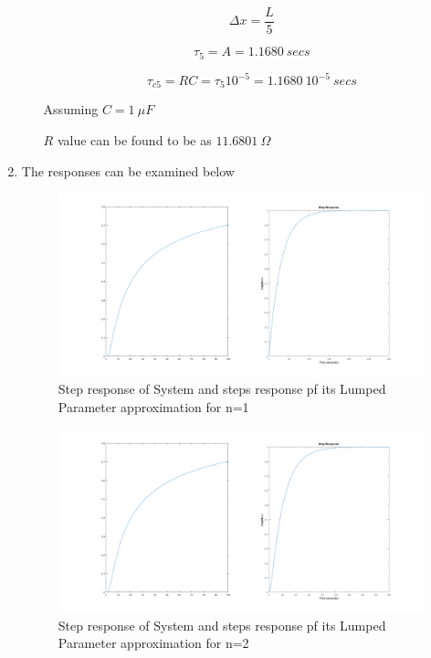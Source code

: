 \documentclass[a4paper,12pt]{article}
\begin{document}
\begin{enumerate}
\begin{itemize}
					$$ \Delta x = \frac{L}{5} $$
				
					$$ \tau_5=A= 1.1680\ secs $$
				
					$$ \tau_{c5}=RC=\tau_5 10^{-5}=1.1680\ 10^{-5}\ secs  $$
					
					Assuming $C=1\ \mu F$
				
					$R$ value can be found to be as $ 11.6801\ \Omega$
				
			
		\end{itemize}
	
	

	
		\item The responses can be examined below
		
			
					\begin{figure}[H]
						\center
						\setlength{\unitlength}{\textwidth} 
						\includegraphics[width=0.9\unitlength]{images/3a}
						\caption{\label{fig:pre2c} Step response of System and steps response pf its Lumped Parameter approximation for n=1}
					\end{figure}
					
					
					\begin{figure}[H]
						\center
						\setlength{\unitlength}{\textwidth} 
						\includegraphics[width=0.9\unitlength]{images/3b}
						\caption{\label{fig:pre2c}  Step response of System and steps response pf its Lumped Parameter approximation for n=2}
					\end{figure}
					

\end{enumerate}
\end{document}
